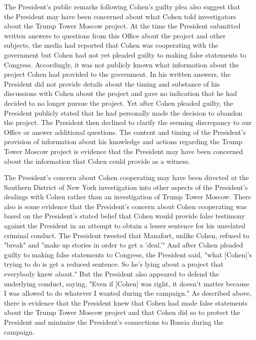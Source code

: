 The President's public remarks following Cohen's guilty plea also suggest that the President may have been concerned about what Cohen told investigators about the Trump Tower Moscow project.
At the time the President submitted written answers to questions from this Office about the project and other subjects, the media had reported that Cohen was cooperating with the government but Cohen had not yet pleaded guilty to making false statements to Congress.
Accordingly, it was not publicly known what information about the project Cohen had provided to the government.
In his written answers, the President did not provide details about the timing and substance of his discussions with Cohen about the project and gave no indication that he had decided to no longer pursue the project.
Yet after Cohen pleaded guilty, the President publicly stated that he had personally made the decision to abandon the project.
The President then declined to clarify the seeming discrepancy to our Office or answer additional questions.
The content and timing of the President's provision of information about his knowledge and actions regarding the Trump Tower Moscow project is evidence that the President may have been concerned about the information that Cohen could provide as a witness.

The President's concern about Cohen cooperating may have been directed at the Southern District of New York investigation into other aspects of the President's dealings with Cohen rather than an investigation of Trump Tower Moscow.
There also is some evidence that the President's concern about Cohen cooperating was based on the President's stated belief that Cohen would provide false testimony against the President in an attempt to obtain a lesser sentence for his unrelated criminal conduct.
The President tweeted that Manafort, unlike Cohen, refused to "break" and "make up stories in order to get a 'deal.'"
And after Cohen pleaded guilty to making false statements to Congress, the President said, "what [Cohen]'s trying to do is get a reduced sentence.
So he's lying about a project that everybody knew about." But the President also appeared to defend the underlying conduct, saying, "Even if [Cohen] was right, it doesn't matter because I was allowed to do whatever I wanted during the campaign."
As described above, there is evidence that the President knew that Cohen had made false statements about the Trump Tower Moscow project and that Cohen did so to protect the President and minimize the President's connections to Russia during the campaign.

